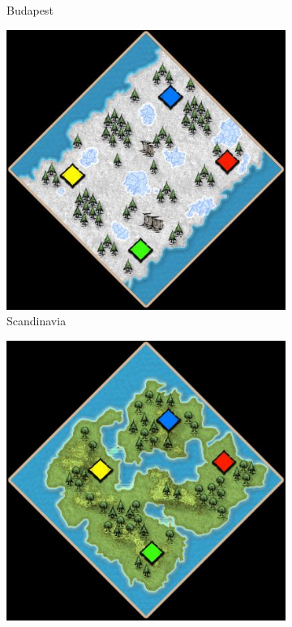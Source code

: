 \begin{figure}
\begin{subfigure}{0.22\textwidth}
        \caption{Budapest}
    \end{subfigure}\quad%
    \begin{subfigure}{0.22\textwidth}
        \centering
        \includegraphics[width=1.0\textwidth]{src/images/maps/rm-scandinavia}
        \caption{Scandinavia}
    \end{subfigure}\quad%
    \begin{subfigure}{0.22\textwidth}
        \centering
        \includegraphics[width=1.0\textwidth]{src/images/maps/rm-continental}

\end{subfigure}
\end{figure}
